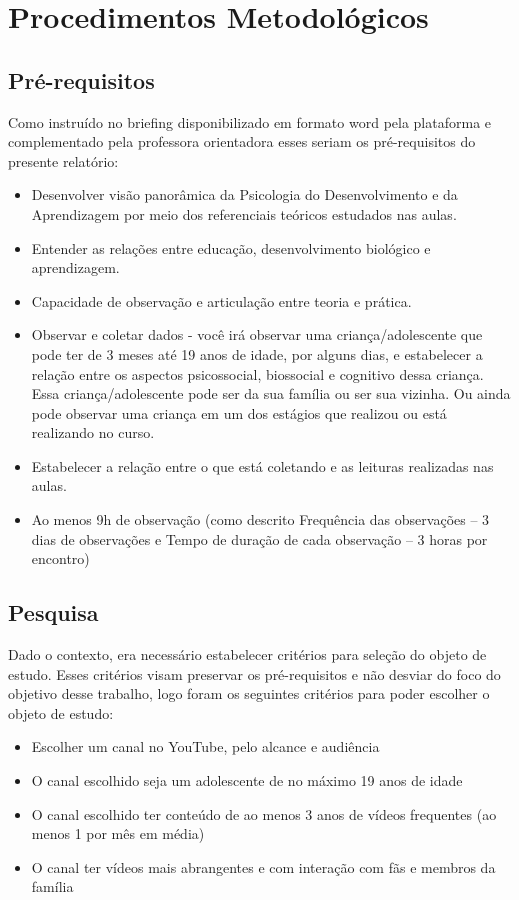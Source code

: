 \chapter{Procedimentos Metodológicos}

\section{Pré-requisitos}

Como instruído no briefing disponibilizado em formato word pela plataforma e complementado pela professora orientadora esses seriam os pré-requisitos do presente relatório:
\begin{itemize}
    \item Desenvolver visão panorâmica da Psicologia do Desenvolvimento e da Aprendizagem por meio dos referenciais teóricos estudados nas aulas.
    \item Entender as relações entre educação, desenvolvimento biológico e aprendizagem.
    \item Capacidade de observação e articulação entre teoria e prática.
    \item Observar e coletar dados  - você irá observar uma criança/adolescente que pode ter de 3 meses até 19 anos de idade, por alguns dias,  e estabelecer a relação entre os aspectos psicossocial, biossocial e cognitivo dessa criança. Essa criança/adolescente pode ser da sua família ou ser sua vizinha. Ou ainda pode observar uma criança em um dos estágios que realizou ou está realizando no curso.
    \item Estabelecer a relação entre o que está coletando e as leituras realizadas nas aulas.
    \item Ao menos 9h de observação (como descrito Frequência das observações – 3 dias de observações e Tempo de duração de cada observação – 3 horas por encontro)
\end{itemize}

\section{Pesquisa}

Dado o contexto, era necessário estabelecer critérios para seleção do objeto de estudo. Esses critérios visam preservar os pré-requisitos e não desviar do foco do objetivo desse trabalho, logo foram os seguintes critérios para poder escolher o objeto de estudo:

\begin{itemize}
    \item Escolher um canal no YouTube, pelo alcance e audiência
    \item O canal escolhido seja um adolescente de no máximo 19 anos de idade
    \item O canal escolhido ter conteúdo de ao menos 3 anos de vídeos frequentes (ao menos 1 por mês em média)
    \item O canal ter vídeos mais abrangentes e com interação com fãs e membros da família
\end{itemize}

